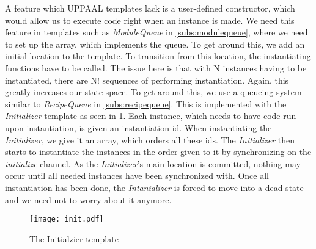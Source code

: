 A feature which UPPAAL templates lack is a user-defined constructor, which would allow us to execute code right when an instance is made. We need this feature in templates such as \emph{ModuleQueue} in \cref{subs:modulequeue}, where we need to set up the array, which implements the queue. To get around this, we add an initial location to the template. To transition from this location, the instantiating functions have to be called. The issue here is that with N instances having to be instantiated, there are N! sequences of performing instantiation. Again, this greatly increases our state space. To get around this, we use a queueing system similar to \emph{RecipeQueue} in \cref{subs:recipequeue}. This is implemented with the \emph{Initializer} template as seen in \cref{fig:initializer}. Each instance, which needs to have code run upon instantiation, is given an instantiation id. When instantiating the \emph{Initializer}, we give it an array, which orders all these ids. The \emph{Initializer} then starts to instantiate the instances in the order given to it by synchronizing on the \emph{initialize} channel. As the \emph{Initializer}'s main location is committed, nothing may occur until all needed instances have been synchronized with. Once all instantiation has been done, the \emph{Intanializer} is forced to move into a dead state and we need not to worry about it anymore.    

\begin{figure}[h]
\centering
\texttt{[image: init.pdf]}
\caption{The Initialzier template}
\label{fig:initializer}
\end{figure}

